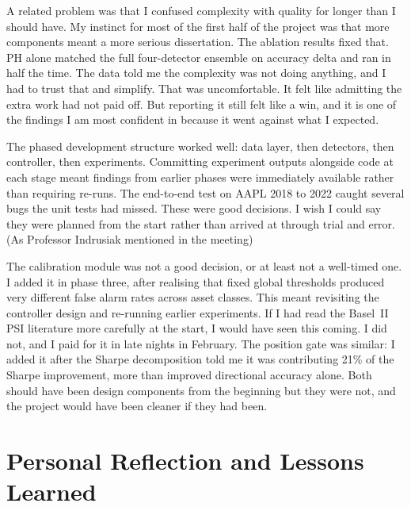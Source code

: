 \begin{appendices}
A related problem was that I confused complexity with quality for longer than I should 
have. My instinct for most of the first half of the project was that more components 
meant a more serious dissertation. The ablation results fixed that. PH alone matched 
the full four-detector ensemble on accuracy delta and ran in half the time. The data 
told me the complexity was not doing anything, and I had to trust that and simplify. 
That was uncomfortable. It felt like admitting the extra work had not paid off. But 
reporting it still felt like a win, and it is one of the findings I am most 
confident in because it went against what I expected.

The phased development structure worked well: data layer, then detectors, then 
controller, then experiments. Committing experiment outputs alongside code at each 
stage meant findings from earlier phases were immediately available rather than 
requiring re-runs. The end-to-end test on AAPL 2018 to 2022 caught several bugs the 
unit tests had missed. These were good decisions. I wish I could say they were planned 
from the start rather than arrived at through trial and error. (As Professor Indrusiak mentioned in the meeting)

The calibration module was not a good decision, or at least not a well-timed one. I 
added it in phase three, after realising that fixed global thresholds produced very 
different false alarm rates across asset classes. This meant revisiting the controller 
design and re-running earlier experiments. If I had read the Basel~II PSI literature 
more carefully at the start, I would have seen this coming. I did not, and I paid for 
it in late nights in February. The position gate was similar: I added it after the 
Sharpe decomposition told me it was contributing 21\% of the Sharpe improvement, more 
than improved directional accuracy alone. Both should have been design 
components from the beginning but they were not, and the project would have been cleaner 
if they had been.

\section{Personal Reflection and Lessons Learned}
\label{sec:reflection}


\end{appendices}
